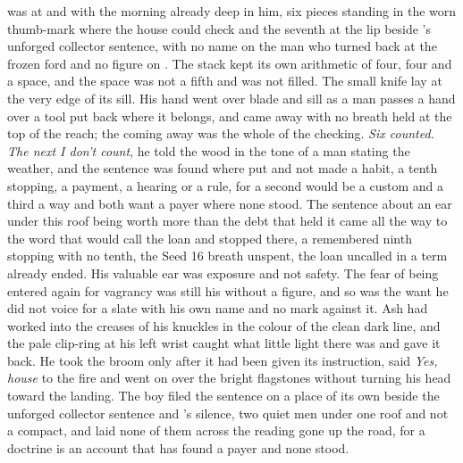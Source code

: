 was at  and  with the morning already deep in him, six pieces standing in the worn thumb-mark where the house could check and the seventh at the lip beside 's unforged collector sentence, with no name on the man who turned back at the frozen ford and no figure on . The stack kept its own arithmetic of four, four and a space, and the space was not a fifth and was not filled. The small knife lay at the very edge of its sill. His hand went over blade and sill as a man passes a hand over a tool put back where it belongs, and came away with no breath held at the top of the reach; the coming away was the whole of the checking. \emph{Six counted. The next I don't count}, he told the wood in the tone of a man stating the weather, and the sentence was found where put and not made a habit, a tenth stopping, a payment, a hearing or a rule, for a second would be a custom and a third a way and both want a payer where none stood. The sentence about an ear under this roof being worth more than the debt that held it came all the way to the word that would call the loan and stopped there, a remembered ninth stopping with no tenth, the Seed 16 breath unspent, the loan uncalled in a term already ended. His valuable ear was exposure and not safety. The fear of being entered again for vagrancy was still his without a figure, and so was the want he did not voice for a slate with his own name and no mark against it. Ash had worked into the creases of his knuckles in the colour of the clean dark line, and the pale clip-ring at his left wrist caught what little light there was and gave it back. He took the broom only after it had been given its instruction, said \emph{Yes, house} to the fire and went on over the bright flagstones without turning his head toward the landing. The boy filed the sentence on a place of its own beside the unforged collector sentence and 's silence, two quiet men under one roof and not a compact, and laid none of them across the reading gone up the road, for a doctrine is an account that has found a payer and none stood.

